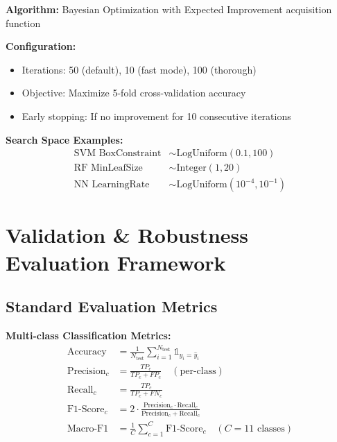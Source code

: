 \documentclass[11pt,a4paper]{article}
\begin{document}
\textbf{Algorithm:} Bayesian Optimization with Expected Improvement acquisition function

\textbf{Configuration:}
\begin{itemize}[itemsep=0.2em]
    \item Iterations: 50 (default), 10 (fast mode), 100 (thorough)
    \item Objective: Maximize 5-fold cross-validation accuracy
    \item Early stopping: If no improvement for 10 consecutive iterations
\end{itemize}

\textbf{Search Space Examples:}
\begin{align*}
\text{SVM BoxConstraint} &\sim \text{LogUniform}(0.1, 100) \\
\text{RF MinLeafSize} &\sim \text{Integer}(1, 20) \\
\text{NN LearningRate} &\sim \text{LogUniform}(10^{-4}, 10^{-1})
\end{align*}

\section{Validation \& Robustness Evaluation Framework}

\subsection{Standard Evaluation Metrics}

\begin{technical}
\textbf{Multi-class Classification Metrics:}
\begin{align}
\text{Accuracy} &= \frac{1}{N_{\text{test}}}\sum_{i=1}^{N_{\text{test}}} \mathbb{1}_{y_i = \hat{y}_i} \\
\text{Precision}_c &= \frac{TP_c}{TP_c + FP_c} \quad (\text{per-class}) \\
\text{Recall}_c &= \frac{TP_c}{TP_c + FN_c} \\
\text{F1-Score}_c &= 2\cdot\frac{\text{Precision}_c \cdot \text{Recall}_c}{\text{Precision}_c + \text{Recall}_c} \\
\text{Macro-F1} &= \frac{1}{C}\sum_{c=1}^{C} \text{F1-Score}_c \quad (C=11 \text{ classes})
\end{align}
\end{technical}
\end{document}
